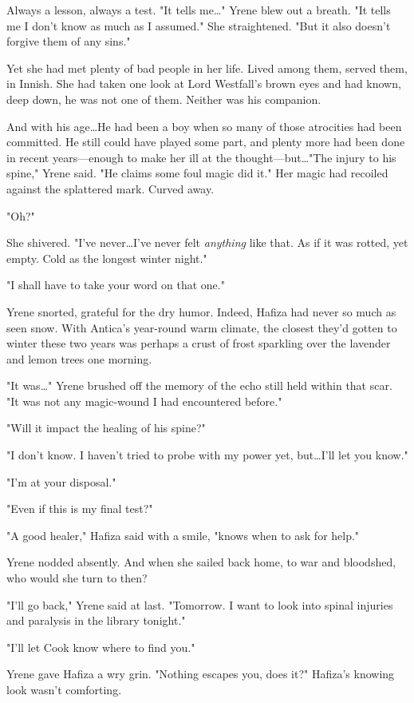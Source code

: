 Always a lesson, always a test.
"It tells me\ldots" Yrene blew out a breath.
"It tells me I don't know as much as I assumed."
She straightened.
"But it also doesn't forgive them of any sins."

Yet she had met plenty of bad people in her life.
Lived among them, served them, in Innish.
She had taken one look at Lord Westfall's brown eyes and had known, deep down, he was not one of them.
Neither was his companion.

And with his age\ldots He had been a boy when so many of those atrocities had been committed.
He still could have played some part, and plenty more had been done in recent years---enough to make her ill at the thought---but\ldots "The injury to his spine," Yrene said.
"He claims some foul magic did it."
Her magic had recoiled against the splattered mark.
Curved away.

"Oh?"

She shivered.
"I've never\ldots I've never felt \emph{anything} like that.
As if it was rotted, yet empty.
Cold as the longest winter night."

"I shall have to take your word on that one."

Yrene snorted, grateful for the dry humor.
Indeed, Hafiza had never so much as seen snow.
With Antica's year-round warm climate, the closest they'd gotten to winter these two years was perhaps a crust of frost sparkling over the lavender and lemon trees one morning.

"It was\ldots" Yrene brushed off the memory of the echo still held within that scar.
"It was not any magic-wound I had encountered before."

"Will it impact the healing of his spine?"

"I don't know.
I haven't tried to probe with my power yet, but\ldots I'll let you know."

"I'm at your disposal."

"Even if this is my final test?"

"A good healer," Hafiza said with a smile, "knows when to ask for help."

Yrene nodded absently.
And when she sailed back home, to war and bloodshed, who would she turn to then?

"I'll go back," Yrene said at last.
"Tomorrow.
I want to look into spinal injuries and paralysis in the library tonight."

"I'll let Cook know where to find you."

Yrene gave Hafiza a wry grin.
"Nothing escapes you, does it?"
Hafiza's knowing look wasn't comforting.

